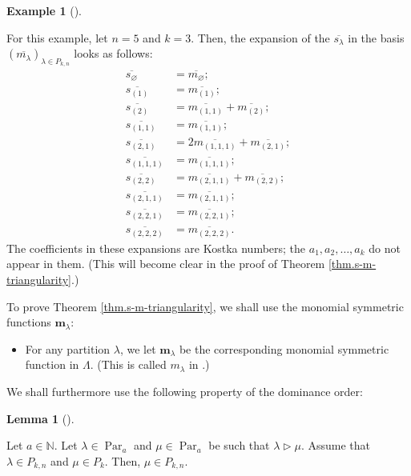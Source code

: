 \documentclass[numbers=enddot,12pt,final,onecolumn,notitlepage]{scrartcl}%
\theoremstyle{definition}
\newtheorem{lem}[theo]{Lemma}
\newenvironment{lemma}[1][]
{\begin{lem}[#1]\begin{leftbar}}
{\end{leftbar}\end{lem}}
\newtheorem{exmp}[theo]{Example}
\newenvironment{example}[1][]
{\begin{exmp}[#1]\begin{leftbar}}
{\end{leftbar}\end{exmp}}
\begin{document}
\begin{example}
For this example, let $n=5$ and $k=3$. Then, the expansion of the
$\overline{s_{\lambda}}$ in the basis $\left(  \overline{m_{\lambda}}\right)
_{\lambda\in P_{k,n}}$ looks as follows:%
\begin{align*}
\overline{s_{\varnothing}}  &  =\overline{m_{\varnothing}};\\
\overline{s_{\left(  1\right)  }}  &  =\overline{m_{\left(  1\right)  }};\\
\overline{s_{\left(  2\right)  }}  &  =\overline{m_{\left(  1,1\right)  }%
}+\overline{m_{\left(  2\right)  }};\\
\overline{s_{\left(  1,1\right)  }}  &  =\overline{m_{\left(  1,1\right)  }%
};\\
\overline{s_{\left(  2,1\right)  }}  &  =2\overline{m_{\left(  1,1,1\right)
}}+\overline{m_{\left(  2,1\right)  }};\\
\overline{s_{\left(  1,1,1\right)  }}  &  =\overline{m_{\left(  1,1,1\right)
}};\\
\overline{s_{\left(  2,2\right)  }}  &  =\overline{m_{\left(  2,1,1\right)  }%
}+\overline{m_{\left(  2,2\right)  }};\\
\overline{s_{\left(  2,1,1\right)  }}  &  =\overline{m_{\left(  2,1,1\right)
}};\\
\overline{s_{\left(  2,2,1\right)  }}  &  =\overline{m_{\left(  2,2,1\right)
}};\\
\overline{s_{\left(  2,2,2\right)  }}  &  =\overline{m_{\left(  2,2,2\right)
}}.
\end{align*}
The coefficients in these expansions are Kostka numbers; the $a_{1}%
,a_{2},\ldots,a_{k}$ do not appear in them. (This will become clear in the
proof of Theorem \ref{thm.s-m-triangularity}.)
\end{example}

To prove Theorem \ref{thm.s-m-triangularity}, we shall use the monomial
symmetric functions $\mathbf{m}_{\lambda}$:

\begin{itemize}
\item For any partition $\lambda$, we let $\mathbf{m}_{\lambda}$ be the
corresponding monomial symmetric function in $\Lambda$. (This is called
$m_{\lambda}$ in \cite[(2.1.1)]{GriRei18}.)
\end{itemize}

We shall furthermore use the following property of the dominance order:

\begin{lemma}
\label{lem.dominance.Pkn}Let $a\in\mathbb{N}$. Let $\lambda\in
\operatorname*{Par}\nolimits_{a}$ and $\mu\in\operatorname*{Par}\nolimits_{a}$
be such that $\lambda\triangleright\mu$. Assume that $\lambda\in P_{k,n}$ and
$\mu\in P_{k}$. Then, $\mu\in P_{k,n}$.
\end{lemma}
\end{document}
